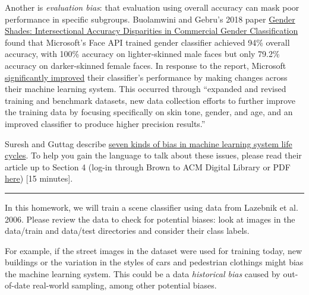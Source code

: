 Another is \emph{evaluation bias}: that evaluation using overall accuracy can mask poor performance in specific subgroups.
Buolamwini and Gebru's 2018 paper \href{http://proceedings.mlr.press/v81/buolamwini18a/buolamwini18a.pdf}{Gender Shades: Intersectional Accuracy Disparities in Commercial Gender Classification} found that Microsoft's Face API trained gender classifier achieved 94\% overall accuracy, with 100\% accuracy on lighter-skinned male faces but only 79.2\% accuracy on darker-skinned female faces. In response to the report, Microsoft \href{https://blogs.microsoft.com/ai/gender-skin-tone-facial-recognition-improvement/}{significantly improved} their classifier's performance by making changes across their machine learning system. This occurred through ``expanded and revised training and benchmark datasets, new data collection efforts to further improve the training data by focusing specifically on skin tone, gender, and age, and an improved classifier to produce higher precision results.''

Suresh and Guttag describe \href{https://dl.acm.org/doi/10.1145/3465416.3483305}{seven kinds of bias in machine learning system life cycles}. To help you gain the language to talk about these issues, please read their article up to Section 4 (log-in through Brown to ACM Digital Library or PDF \href{https://drive.google.com/file/d/10YdCwZ0E0XBYS3oj_hfeI0TQ6lpepGKK/view}{here}) [15 minutes].

\vspace{3ex}
\hrule
\vspace{1ex}

In this homework, we will train a scene classifier using data from Lazebnik et al. 2006. Please review the data to check for potential biases: look at images in the data/train and data/test directories and consider their class labels. 

For example, if the street images in the dataset were used for training today, new buildings or the variation in the styles of cars and pedestrian clothings might bias the machine learning system. This could be a data \emph{historical bias} caused by out-of-date real-world sampling, among other potential biases. 

